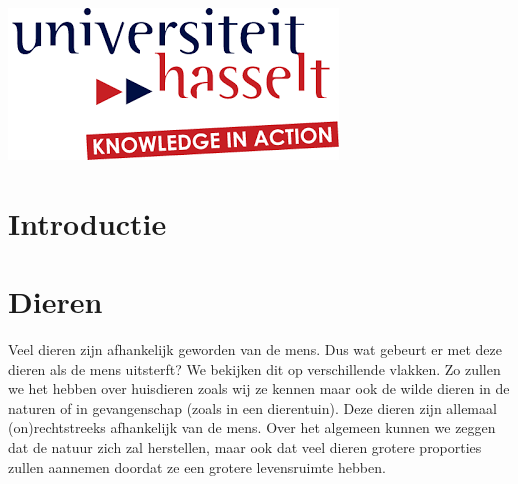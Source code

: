 \begin{titlepage}
\includegraphics{logo.png}\\[1cm] %
 

\vfill %

\end{titlepage}



\section{Introductie}
\section{Dieren}
Veel dieren zijn afhankelijk geworden van de mens. Dus wat gebeurt er met deze dieren als de mens uitsterft? We bekijken dit op verschillende vlakken. Zo zullen we het hebben over huisdieren zoals wij ze kennen maar ook de wilde dieren in de naturen of in gevangenschap (zoals in een dierentuin). Deze dieren zijn allemaal (on)rechtstreeks afhankelijk van de mens. Over het algemeen kunnen we zeggen dat de natuur zich zal herstellen, maar ook dat veel dieren grotere proporties zullen aannemen doordat ze een grotere levensruimte hebben. \cite{ASAPScience,LAPOutbreak}

